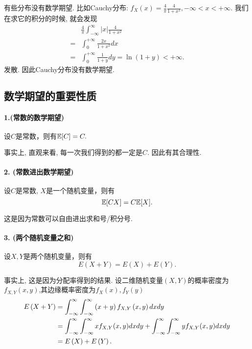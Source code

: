    有些分布没有数学期望. 比如Cauchy分布: $f_X(x)=\frac{4}{\pi} \frac{4}{1+x^2},-\infty<x<+\infty$. 我们在求它的积分的时候, 就会发现
    $$
\begin{aligned}
& \frac{4}{\pi} \int_{-\infty}^{\infty}|x| \frac{4}{1+x^2} \\
= & \int_0^{+\infty} \frac{2 x}{1+x^2} d x \\
= & \int_0^{+\infty} \frac{1}{1+y} d y=\ln (1+y)<+\infty .
\end{aligned}
$$发散. 因此Cauchy分布没有数学期望. 

    \subsection{数学期望的重要性质}
    
    \paragraph{1.(常数的数学期望)} 设$C$是常数，则有$\mathbb E[C] = C.$

    事实上, 直观来看, 每一次我们得到的都一定是$C$. 因此有其合理性. 

    \paragraph{2. (常数进出数学期望)} 设$C$是常数, $X$是一个随机变量，则有
    \[
        \mathbb E[CX] = C\mathbb E[X].
    \]
    
    这是因为常数可以自由进出求和号/积分号. 

    \paragraph{3. (两个随机变量之和)}设$X,Y$是两个随机变量，则有
    \[
        E\left(X+Y\right) = E\left(X\right) + E\left(Y\right).
    \]

    事实上, 这是因为分配率得到的结果. 设二维随机变量$\left(X,Y\right)$的概率密度为$f_{X,Y}\left(x,y\right)$,其边缘概率密度为$f_X(x),f_Y(y)$
    \begin{align}
        E\left(X+Y\right) &= \int_{-\infty}^{\infty}\int_{-\infty}^{\infty}\left(x+y\right)f_{X,Y}\left(x,y\right){d}x{d}y \notag\\
        & =  \int_{-\infty}^{\infty}\int_{-\infty}^{\infty}xf_{X,Y}(x,y){d}x{d}y + \int_{-\infty}^{\infty}\int_{-\infty}^{\infty}yf_{X,Y}(x,y){d}x{d}y \notag\\
        & = E\left(X\right) + E\left(Y\right)\notag.
    \end{align}

